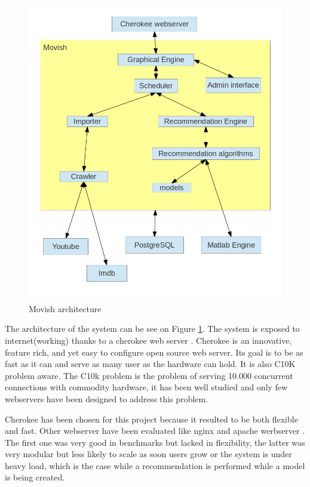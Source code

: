 \begin{figure}
  \centering
  \includegraphics[width=\textwidth]{figures/movish_architecture.png}
  \caption{Movish architecture}
  \label{fig:movish_architecture}
\end{figure}

The architecture of the system can be see on Figure \ref{fig:movish_architecture}.
The system is exposed to internet(working) thanks to a cherokee web server \cite{cherokee}. Cherokee is an innovative, feature rich, and yet easy to configure open source web server. Its goal is to be as fast as it can and serve as many user as the hardware can hold. It is also C10K problem \cite{c10k-problem} aware. The C10k problem is the problem of serving 10.000 concurrent connections with commodity hardware, it has been well studied and only few webservers have been designed to address this problem.

Cherokee has been chosen for this project because it resulted to be both flexible and fast. Other webserver have been evaluated like nginx \cite{nginx} and apache werbserver \cite{apache-webserver}. The first one was very good in benchmarks but lacked in flexibility, the latter was very modular but less likely to scale as soon users grow or the system is under heavy load, which is the case while a recommendation is performed while a model is being created.

